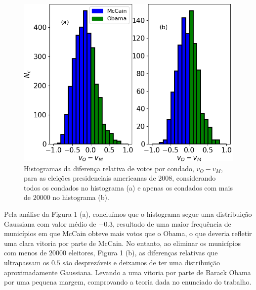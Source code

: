 \documentclass[aps,pre,twocolumn,showpacs,amsmath,amssymb]{revtex4-1}
\begin{document}
\begin{figure}[hbt!]
    \includegraphics[scale=0.53,left]{obamamccaincounties.png}
    \caption{Histogramas da diferença relativa de votos por condado, $v_O-v_M$, para as eleições presidenciais americanas de $2008$, considerando todos os condados no histograma (a) e apenas os condados com mais de $20000$ no histograma (b).}
\end{figure}

Pela análise da Figura 1 (a), concluímos que o histograma segue uma distribuição Gaussiana com valor médio de $-0.3$, resultado de uma maior frequência de municípios em que McCain obteve mais votos que o Obama, o que deveria refletir uma clara vitoria por parte de McCain. No entanto, ao eliminar os municípios com menos de $20 000$ eleitores, Figura 1 (b), as diferenças relativas que ultrapassam os $0.5$ são desprezáveis e deixamos de ter uma distribuição aproximadamente Gaussiana. Levando a uma vitoria por parte de Barack Obama por uma pequena margem, comprovando a teoria dada no enunciado do trabalho.
\end{document}
